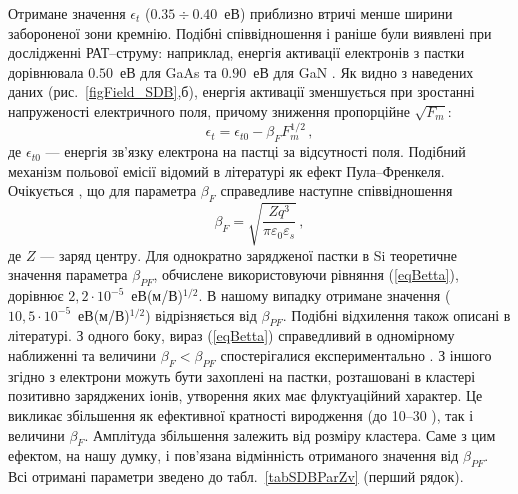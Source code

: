 Отримане значення $\epsilon_t$ ($0.35\div0.40$~еВ) приблизно втричі менше ширини забороненої зони кремнію.
Подібні співвідношення і раніше були виявлені при дослідженні РАТ--струму:
наприклад, енергія активації електронів з пастки дорівнювала $0.50$~еВ для GaAs \cite{Pipinys1999} та $0.90$~еВ для GaN \cite{Pipinys2006}.
Як видно з наведених даних (рис.~\ref{figField_SDB},б),
енергія активації зменшується при зростанні напруженості електричного поля,
причому зниження пропорційне $\sqrt{F_m}$:
\begin{equation}\label{eqEtE}
    \epsilon_t=\epsilon_{t0}-\beta_F F_m^{1/2}\,,
\end{equation}
де
$\epsilon_{t0}$ --- енергія зв'язку електрона на пастці за відсутності поля.
Подібний механізм польової емісії відомий в літературі як ефект Пула--Френкеля.
Очікується \cite{PF:Mitrofanov,PF:ZhdanovaR}, що для параметра $\beta_F$ справедливе наступне співвідношення
\begin{equation}\label{eqBetta}
    \beta_F=\sqrt{\frac{Zq^3}{\pi\varepsilon_0\varepsilon_s}}\,,
\end{equation}
де
$Z$ --- заряд центру.
Для однократно зарядженої пастки в Si теоретичне значення параметра $\beta_{PF}$, обчислене використовуючи
рівняння (\ref{eqBetta}), дорівнює $2,2\cdot10^{-5}$~еВ(м/В)$^{1/2}$.
В нашому випадку отримане значення ($10,5\cdot10^{-5}$~еВ(м/В)$^{1/2}$) відрізняється від $\beta_{PF}$.
Подібні відхилення також описані в літературі.
З одного боку, вираз (\ref{eqBetta}) справедливий в одномірному наближенні та величини  $\beta_F<\beta_{PF}$ спостерігалися експериментально \cite{PF:Mitrofanov,PF:ZhdanovaR}.
З іншого згідно з \cite{PF:ZhdanovaR} електрони можуть бути захоплені на пастки, розташовані в кластері позитивно заряджених іонів, утворення яких має флуктуаційний характер.
Це викликає збільшення як ефективної кратності виродження (до 10--30 \cite{PF:ZhdanovaR}), так і величини $\beta_F$.
Амплітуда збільшення залежить від розміру кластера.
Саме з цим ефектом, на нашу думку, і пов'язана відмінність отриманого значення від $\beta_{PF}$.
Всі отримані параметри зведено до табл.~\ref{tabSDBParZv} (перший рядок).





